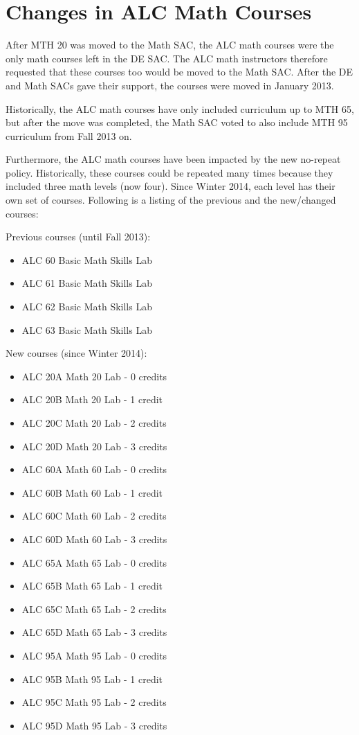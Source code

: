 \chapter{Changes in ALC Math Courses}\label{app:sec:alc}
After MTH 20 was moved to the Math SAC, the ALC math courses were the only math courses left in the DE SAC. The ALC math instructors therefore requested that these courses too would be moved to the Math SAC. After the DE and Math SACs gave their support, the courses were moved in January 2013.

Historically, the ALC math courses have only included curriculum up to MTH 65, but after the move was completed, the Math SAC voted to also include MTH 95 curriculum from Fall 2013 on.

Furthermore, the ALC math courses have been impacted by the new no-repeat policy. Historically, these courses could be repeated many times because they included three math levels (now four). Since Winter 2014, each level has their own set of courses. Following is a listing  of the previous and the new/changed courses:

\begin{multicols}{2}
Previous courses (until Fall 2013):
\begin{itemize}[label={}]
  \item ALC 60 Basic Math Skills Lab
  \item ALC 61 Basic Math Skills Lab
  \item ALC 62 Basic Math Skills Lab
  \item ALC 63 Basic Math Skills Lab
\end{itemize}
\vfill
\columnbreak
New courses (since Winter 2014):
\begin{itemize}[label={}]
  \item ALC 20A Math 20 Lab - 0 credits 
  \item ALC 20B Math 20 Lab - 1 credit 
  \item ALC 20C Math 20 Lab - 2 credits 
  \item ALC 20D Math 20 Lab - 3 credits 

  \item ALC 60A Math 60 Lab - 0 credits 
  \item ALC 60B Math 60 Lab - 1 credit 
  \item ALC 60C Math 60 Lab - 2 credits 
  \item ALC 60D Math 60 Lab - 3 credits 

  \item ALC 65A Math 65 Lab - 0 credits 
  \item ALC 65B Math 65 Lab - 1 credit 
  \item ALC 65C Math 65 Lab - 2 credits 
  \item ALC 65D Math 65 Lab - 3 credits 

  \item ALC 95A Math 95 Lab - 0 credits 
  \item ALC 95B Math 95 Lab - 1 credit 
  \item ALC 95C Math 95 Lab - 2 credits 
  \item ALC 95D Math 95 Lab - 3 credits
\end{itemize}
\vfill
\end{multicols}

